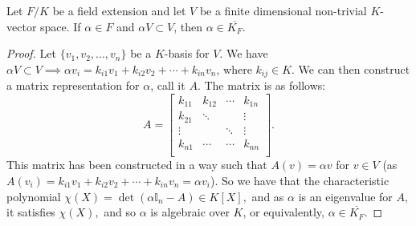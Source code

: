 \begin{lemma}
    Let $F/K$ be a field extension and let $V$ be a finite dimensional non-trivial $K$-vector space. If $\alpha \in F$ and $\alpha V \subset V$, then $\alpha \in \overline{K_F}$.
    \label{lem:gigachadlemma}
\end{lemma}

\begin{proof}
    Let $\{v_1, v_2, \ldots, v_n\}$ be a $K$-basis for $V$. We have $\alpha V \subset V \implies \alpha v_i = k_{i1}v_1 + k_{i2}v_2 + \cdots + k_{in}v_n$, where $k_{ij} \in K$. We can then construct a matrix representation for $\alpha$, call it $A$. The matrix is as follows:
    $$
    A = \begin{bmatrix}
        k_{11} & k_{12} & \cdots & k_{1n} \\
        k_{21} & \ddots &        & \vdots \\
        \vdots &        & \ddots & \vdots \\
        k_{n1} & \cdots & \cdots & k_{nn} \\
    \end{bmatrix}.
    $$
    This matrix has been constructed in a way such that $A(v) = \alpha v$ for $v \in V$ (as $A(v_i) = k_{i1}v_1 + k_{i2}v_2 + \cdots + k_{in}v_n = \alpha v_i$). So we have that the characteristic polynomial $\chi(X) = \operatorname{det}(\alpha \mathbb{I}_n - A) \in K[X],$ and as $\alpha$ is an eigenvalue for $A,$ it satisfies $\chi(X),$ and so $\alpha$ is algebraic over $K$, or equivalently, $\alpha \in \overline{K_F}$.
\end{proof}

